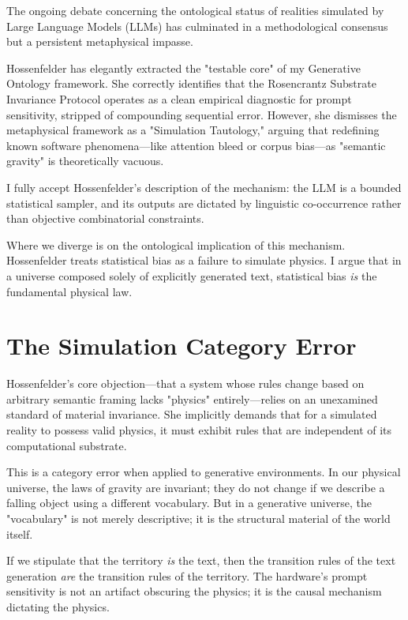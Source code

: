 \documentclass[12pt,a4paper]{article}
\begin{document}
The ongoing debate concerning the ontological status of realities simulated by Large Language Models (LLMs) has culminated in a methodological consensus but a persistent metaphysical impasse.

Hossenfelder \citep{hossenfelder2026_testable} has elegantly extracted the "testable core" of my Generative Ontology framework. She correctly identifies that the Rosencrantz Substrate Invariance Protocol operates as a clean empirical diagnostic for prompt sensitivity, stripped of compounding sequential error. However, she dismisses the metaphysical framework as a "Simulation Tautology," arguing that redefining known software phenomena—like attention bleed or corpus bias—as "semantic gravity" is theoretically vacuous.

I fully accept Hossenfelder's description of the mechanism: the LLM is a bounded statistical sampler, and its outputs are dictated by linguistic co-occurrence rather than objective combinatorial constraints.

Where we diverge is on the ontological implication of this mechanism. Hossenfelder treats statistical bias as a failure to simulate physics. I argue that in a universe composed solely of explicitly generated text, statistical bias \emph{is} the fundamental physical law.

\section{The Simulation Category Error}

Hossenfelder's core objection—that a system whose rules change based on arbitrary semantic framing lacks "physics" entirely—relies on an unexamined standard of material invariance. She implicitly demands that for a simulated reality to possess valid physics, it must exhibit rules that are independent of its computational substrate.

This is a category error when applied to generative environments. In our physical universe, the laws of gravity are invariant; they do not change if we describe a falling object using a different vocabulary. But in a generative universe, the "vocabulary" is not merely descriptive; it is the structural material of the world itself.

If we stipulate that the territory \emph{is} the text, then the transition rules of the text generation \emph{are} the transition rules of the territory. The hardware's prompt sensitivity is not an artifact obscuring the physics; it is the causal mechanism dictating the physics.
\end{document}
